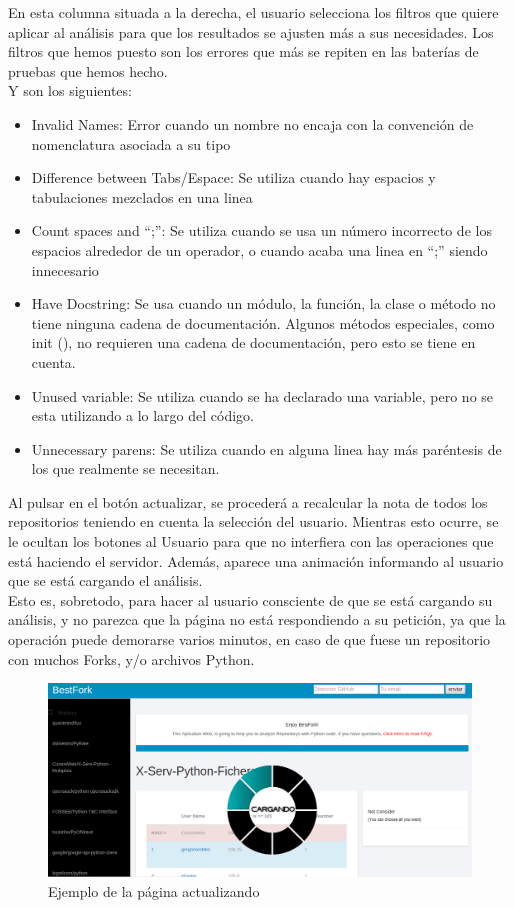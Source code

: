 \documentclass[a4paper, 12pt]{book}
\begin{document}
En esta columna situada a la derecha, el usuario selecciona los filtros que quiere aplicar al análisis para que los resultados se ajusten más a sus necesidades. Los filtros que hemos puesto son los errores que más se repiten en las baterías de pruebas que hemos hecho.\\
Y son los siguientes:
\begin{itemize}
\item Invalid Names: Error cuando un nombre no encaja con la convención de nomenclatura asociada a su tipo
\item Difference between Tabs/Espace: Se utiliza cuando hay espacios y tabulaciones mezclados en una linea
\item Count spaces and ``;'': Se utiliza cuando se usa un número incorrecto de los espacios alrededor de un operador,  o cuando acaba una linea en ``;'' siendo innecesario
\item Have Docstring: Se usa cuando un módulo, la función, la clase o método no tiene ninguna cadena de documentación. Algunos métodos especiales, como init (), no requieren una cadena de documentación, pero esto se tiene en cuenta.
\item Unused variable: Se utiliza cuando se ha declarado una variable, pero no se esta utilizando a lo largo del código.
\item Unnecessary parens: Se utiliza cuando en alguna linea hay más paréntesis de los que realmente se necesitan.
\end{itemize}
Al pulsar en el botón actualizar, se procederá a recalcular la nota de todos los repositorios teniendo en cuenta la selección del usuario. Mientras esto ocurre, se le ocultan los botones al Usuario para que no interfiera con las operaciones que está haciendo el servidor. Además, aparece una animación informando al usuario que se está cargando el análisis.\\
Esto es, sobretodo, para hacer al usuario consciente de que se está cargando su análisis, y no parezca que la página no está respondiendo a su petición, ya que la operación puede demorarse varios minutos, en caso de que fuese un repositorio con muchos Forks, y/o archivos Python.

\begin{figure}[H]
\centering
\includegraphics[scale=0.35]{img/charge1.png} 
\caption{Ejemplo de la página actualizando}
\end{figure}
\newpage
\end{document}
